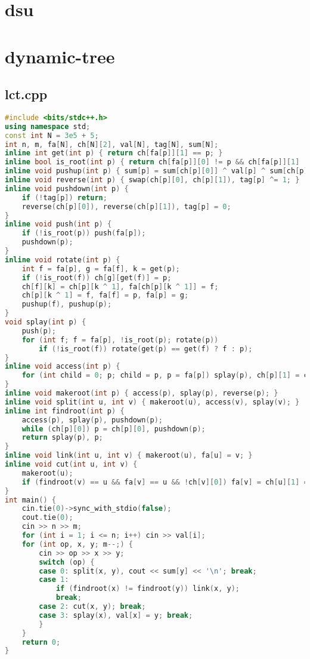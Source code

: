 \documentclass[9pt, a4paper, oneside]{book}
\begin{document}
\section{dsu}
\section{dynamic-tree}
\subsection{lct.cpp}
\begin{lstlisting}[language={C++}]
#include <bits/stdc++.h>
using namespace std;
const int N = 3e5 + 5;
int n, m, fa[N], ch[N][2], val[N], tag[N], sum[N];
inline int get(int p) { return ch[fa[p]][1] == p; }
inline bool is_root(int p) { return ch[fa[p]][0] != p && ch[fa[p]][1] != p; }
inline void pushup(int p) { sum[p] = sum[ch[p][0]] ^ val[p] ^ sum[ch[p][1]]; }
inline void reverse(int p) { swap(ch[p][0], ch[p][1]), tag[p] ^= 1; }
inline void pushdown(int p) {
    if (!tag[p]) return;
    reverse(ch[p][0]), reverse(ch[p][1]), tag[p] = 0;
}
inline void push(int p) {
    if (!is_root(p)) push(fa[p]);
    pushdown(p);
}
inline void rotate(int p) {
    int f = fa[p], g = fa[f], k = get(p);
    if (!is_root(f)) ch[g][get(f)] = p;
    ch[f][k] = ch[p][k ^ 1], fa[ch[p][k ^ 1]] = f;
    ch[p][k ^ 1] = f, fa[f] = p, fa[p] = g;
    pushup(f), pushup(p);
}
void splay(int p) {
    push(p);
    for (int f; f = fa[p], !is_root(p); rotate(p))
        if (!is_root(f)) rotate(get(p) == get(f) ? f : p);
}
inline void access(int p) {
    for (int child = 0; p; child = p, p = fa[p]) splay(p), ch[p][1] = child, pushup(p);
}
inline void makeroot(int p) { access(p), splay(p), reverse(p); }
inline void split(int u, int v) { makeroot(u), access(v), splay(v); }
inline int findroot(int p) {
    access(p), splay(p), pushdown(p);
    while (ch[p][0]) p = ch[p][0], pushdown(p);
    return splay(p), p;
}
inline void link(int u, int v) { makeroot(u), fa[u] = v; }
inline void cut(int u, int v) {
    makeroot(u);
    if (findroot(v) == u && fa[v] == u && !ch[v][0]) fa[v] = ch[u][1] = 0, pushup(u);
}
int main() {
    cin.tie(0)->sync_with_stdio(false);
    cout.tie(0);
    cin >> n >> m;
    for (int i = 1; i <= n; i++) cin >> val[i];
    for (int op, x, y; m--;) {
        cin >> op >> x >> y;
        switch (op) {
        case 0: split(x, y), cout << sum[y] << '\n'; break;
        case 1:
            if (findroot(x) != findroot(y)) link(x, y);
            break;
        case 2: cut(x, y); break;
        case 3: splay(x), val[x] = y; break;
        }
    }
    return 0;
}
\end{lstlisting}
\end{document}
